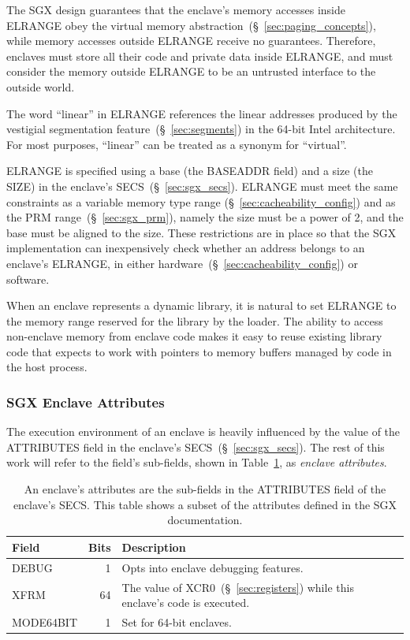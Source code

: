 The SGX design guarantees that the enclave's memory accesses inside ELRANGE
obey the virtual memory abstraction~(\S~\ref{sec:paging_concepts}), while
memory accesses outside ELRANGE receive no guarantees. Therefore, enclaves must
store all their code and private data inside ELRANGE, and must consider the
memory outside ELRANGE to be an untrusted interface to the outside world.

The word ``linear'' in ELRANGE references the linear addresses produced by the
vestigial segmentation feature~(\S~\ref{sec:segments}) in the 64-bit Intel
architecture. For most purposes, ``linear'' can be treated as a synonym for
``virtual''.

ELRANGE is specified using a base (the BASEADDR field) and a size (the SIZE)
in the enclave's SECS~(\S~\ref{sec:sgx_secs}). ELRANGE must meet the same
constraints as a variable memory type range (\S~\ref{sec:cacheability_config})
and as the PRM range~(\S~\ref{sec:sgx_prm}), namely the size must be a power of
2, and the base must be aligned to the size. These restrictions are in place so
that the SGX implementation can inexpensively check whether an address belongs
to an enclave's ELRANGE, in either hardware~(\S~\ref{sec:cacheability_config})
or software.

When an enclave represents a dynamic library, it is natural to set ELRANGE to
the memory range reserved for the library by the loader. The ability to access
non-enclave memory from enclave code makes it easy to reuse existing library
code that expects to work with pointers to memory buffers managed by code in the
host process.


\subsubsection{SGX Enclave Attributes}
\label{sec:sgx_secs_attributes}

The execution environment of an enclave is heavily influenced by the value of
the ATTRIBUTES field in the enclave's SECS~(\S~\ref{sec:sgx_secs}). The rest of
this work will refer to the field's sub-fields, shown in
Table~\ref{fig:sgx_secs_attributes}, as \textit{enclave attributes}.


\begin{table}[hbt]
  \centering
  \begin{tabularx}{\columnwidth}{| l | r | X |}
  \hline
  \textbf{Field} & \textbf{Bits} & \textbf{Description} \\
  \hline
  DEBUG & 1 & Opts into enclave debugging features. \\
  \hline
  XFRM & 64 & The value of XCR0~(\S~\ref{sec:registers}) while this enclave's
              code is executed. \\
  \hline
  MODE64BIT & 1 & Set for 64-bit enclaves. \\
  \hline
  \end{tabularx}
  \caption{
    An enclave's attributes are the sub-fields in the ATTRIBUTES field of the
    enclave's SECS. This table shows a subset of the attributes defined in the
    SGX documentation.
  }
  \label{fig:sgx_secs_attributes}
\end{table}


